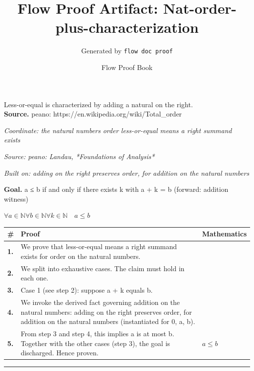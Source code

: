 \documentclass[11pt]{article}
\title{Flow Proof Artifact: Nat-order-plus-characterization}
\author{Generated by \texttt{flow doc proof}}
\date{Flow Proof Book}
\theoremstyle{definition}
\begin{document}
\maketitle
Less-or-equal is characterized by adding a natural on the right.\\[0.5em]
\textbf{Source.} peano: https://en.wikipedia.org/wiki/Total\_order\\[0.5em]
\bigskip
{}\par
\smallskip\noindent\textit{Coordinate: the natural numbers \cdot order \cdot less-or-equal means a right summand exists}\par
\smallskip\noindent\textit{Source: peano: Landau, *Foundations of Analysis*}\par
\smallskip\noindent\textit{Built on: adding on the right preserves order, for addition on the natural numbers}\par
\medskip
\noindent\textbf{Goal.} a ≤ b if and only if there exists k with a + k = b (forward: addition witness)\par
\noindent$\displaystyle \forall a \in \mathbb{N} \forall b \in \mathbb{N} \forall k \in \mathbb{N}\quad a \le b$\par
\medskip
\noindent
\begin{tabular}{@{} >{\raggedright\arraybackslash}p{} >{\raggedright\arraybackslash}p{} >{\raggedleft\arraybackslash}p{} @{}}
\textbf{\#} & \textbf{Proof} & \textbf{Mathematics} \\
\midrule
\textbf{1.} & We prove that less-or-equal means a right summand exists for order on the natural numbers. & \\[0.45em]
\textbf{2.} & We split into exhaustive cases. The claim must hold in each one. & \\[0.45em]
\textbf{3.} & Case 1 (see step 2): suppose a + k  equals  b. & \\[0.45em]
\textbf{4.} & We invoke the derived fact governing addition on the natural numbers: adding on the right preserves order, for addition on the natural numbers (instantiated for 0, a, b). & \\[0.45em]
\textbf{5.} & From step 3 and step 4, this implies a is at most b. Together with the other cases (step 3), the goal is discharged. Hence proven. & $\displaystyle a \le b$ \\[0.45em]
\bottomrule
\end{tabular}
\label{thm:Nat-order-less_or_equal_means_a_right_summand_exists}
\par\medskip\hrule
\end{document}
